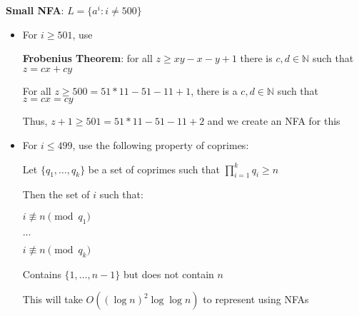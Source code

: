 \documentclass{article}
\begin{document}
  \textbf{Small NFA}: $L = \{a^i \colon i \neq 500\}$
    \begin{itemize}
      \item For $i \geq 501$, use

        \textbf{Frobenius Theorem}: for all $ z \geq xy - x - y + 1$ there is $c, d \in \mathbb{N}$ such that $z = cx + cy$

        For all $z \geq 500 = 51*11 - 51 - 11 + 1$, there is a $c,d \in \mathbb{N}$ such that $z = cx = cy$

        Thus, $ z + 1 \geq 501 = 51 * 11 - 51 - 11 + 2$ and we create an NFA for this
      \item For $i \leq 499$, use the following property of coprimes:

        Let $\{q_1, \ldots, q_k\}$ be a set of coprimes such that $\prod_{i = 1}^{k}q_i \geq n$

        Then the set of $i$ such that:

        $i \not\equiv n \pmod{q_1}$

        $\ldots$

        $i \not\equiv n \pmod{q_k}$
        
        Contains $\{1, \ldots, n -1 \}$ but does not contain $n$

        This will take $O((\log{n})^2\log{\log{n}})$ to represent using NFAs


\end{itemize}
\end{document}
